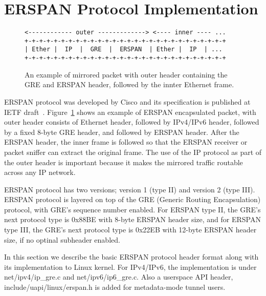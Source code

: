 \documentclass{sigplanconf}
\begin{document}
\section{ERSPAN Protocol Implementation}
\begin{figure}
{\scriptsize
\begin{verbatim}
<------------ outer -------------> <---- inner ---- ...
+-+-+-+-+-+-+-+-+-+-+-+-+-+-+-+-+-+-+-+-+-+-+-+-+-+-+-+
| Ether |  IP  |  GRE  |  ERSPAN  | Ether |  IP  | ...   
+-+-+-+-+-+-+-+-+-+-+-+-+-+-+-+-+-+-+-+-+-+-+-+-+-+-+-+
\end{verbatim}
}
\vspace{-1.0em}
\caption{An example of mirrored packet with outer header containing
the GRE and ERSPAN header, followed by the innter Ethernet frame.}
\label{erspanhdr}
\vspace{-1.0em}
\end{figure}

ERSPAN protocol was developed by Cisco and its specification is published at IETF
draft~\cite{erspan_ietf}. 
Figure~\ref{erspanhdr} shows an example of ERSPAN encapsulated
packet, with outer header consists of Ethernet header, followed by IPv4/IPv6
header, followed by a fixed 8-byte GRE header, and followed by ERSPAN header.
After the ERSPAN header, the inner frame is followed so that the ERSPAN receiver
or packet sniffer can extract the original frame.
The use of the IP protocol as part of the outer header is important because it
makes the mirrored traffic routable across any IP network.

ERSPAN protocol has two versions; version 1 (type II) and
version 2 (type III). ERSPAN protocol is layered on top of the GRE (Generic Routing
Encapsulation) protocol, with GRE's sequence number enabled.  For ERSPAN type II,
the GRE's next protocol type is 0x88BE with 8-byte ERSPAN header size, and for
ERSPAN type III, the GRE's next protocol type is 0x22EB with 12-byte ERSPAN header
size, if no optinal subheader enabled.

In this section we describe the basic ERSPAN protocol header format
along with its implementation to Linux kernel.
For IPv4/IPv6, the implementation is under net/ipv4/ip\_gre.c and
net/ipv6/ip6\_gre.c. Also a userspace API header, include/uapi/linux/erspan.h
is added for metadata-mode tunnel users.
\end{document}
